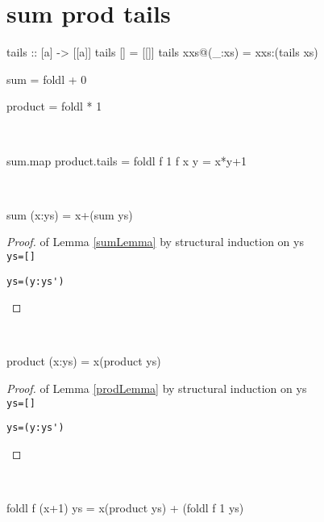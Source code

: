 \section{sum prod tails}
\begin{code}
tails :: [a] -> [[a]]
tails []         = [[]]
tails xxs@(_:xs) = xxs:(tails xs)
\end{code}
\begin{code}
sum = foldl + 0
\end{code}
\begin{code}
product = foldl * 1
\end{code}
\begin{claim}\label{tailsClaim}\ 
\begin{code}
sum.map product.tails = foldl f 1
                f x y = x*y+1
\end{code}
\end{claim}\begin{lemma}\label{sumLemma}\ 
\begin{code}
sum (x:ys) = x+(sum ys)
\end{code}
\end{lemma}
\begin{proof} of Lemma \ref{sumLemma} by structural induction on ys\\
\verb|ys=[]|
\begin{code}
\end{code}
\verb|ys=(y:ys')|
\begin{code}
\end{code}
\end{proof}
\begin{lemma}\label{prodLemma}\ 
\begin{code}
product (x:ys) = x(product ys)
\end{code}
\end{lemma}
\begin{proof} of Lemma \ref{prodLemma} by structural induction on ys\\
\verb|ys=[]|
\begin{code}
\end{code}
\verb|ys=(y:ys')|
\begin{code}
\end{code}
\end{proof}
\begin{lemma}\label{prodfoldlLemma}\ 
\begin{code}
foldl f (x+1) ys = x(product ys) + (foldl f 1 ys)
\end{code}
\end{lemma}
